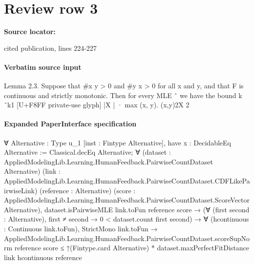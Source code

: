 \documentclass[10pt]{article}
\begin{document}
\section*{Review row 3}
\textbf{Source locator:} {\footnotesize\raggedright cited publication, lines 224-\allowbreak{}227\par}
\paragraph{Verbatim source input}
\begin{ReviewVerbatim}
Lemma 2.3. Suppose that #{x            y} > 0 and #{y      x} > 0 for all x and y, and that F is
continuous and strictly monotonic. Then for every MLE ˆ we have the bound
                                   k ˆk1 [U+F8FF private-use glyph] |X | · max (x, y).
                                                   (x,y)2X 2
\end{ReviewVerbatim}



\paragraph{Expanded PaperInterface specification}
\begin{ReviewVerbatim}
∀ {Alternative : Type u_1} [inst : Fintype Alternative],
  have x : DecidableEq Alternative := Classical.decEq Alternative;
  ∀ (dataset : AppliedModelingLib.Learning.HumanFeedback.PairwiseCountDataset Alternative)
    (link : AppliedModelingLib.Learning.HumanFeedback.PairwiseCountDataset.CDFLikePairwiseLink)
    (reference : Alternative)
    (score : AppliedModelingLib.Learning.HumanFeedback.PairwiseCountDataset.ScoreVector Alternative),
    dataset.isPairwiseMLE link.toFun reference score →
      (∀ (first second : Alternative), first ≠ second → 0 < dataset.count first second) →
        ∀ (hcontinuous : Continuous link.toFun),
          StrictMono link.toFun →
            AppliedModelingLib.Learning.HumanFeedback.PairwiseCountDataset.scoreSupNorm reference score ≤
              ↑(Fintype.card Alternative) * dataset.maxPerfectFitDistance link hcontinuous reference
\end{ReviewVerbatim}
\end{document}
